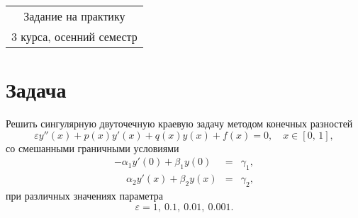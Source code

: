 \documentclass[a4paper,final,12pt]{article}
\begin{document}
\begin{center}
	\Large\bf\em 
	\begin{tabular}{c}
		Задание на практику \\
		3 курса, осенний семестр
	\end{tabular}
\end{center}

	
	
\section*{Задача}
Решить сингулярную двуточечную краевую задачу методом конечных разностей
$$
\varepsilon y''(x) + p(x)y'(x) + q(x)y(x) + f(x) = 0,\quad x\in[0,\,1],
$$
со смешанными граничными условиями
$$
\begin{array}{rcl}
-\alpha_1y'(0) + \beta_1y(0)			&=&	\gamma_1,\\[8pt]
\phantom{-}\alpha_2y'(x) + \beta_2y(x)	&=&	\gamma_2,
\end{array}
$$
при различных значениях параметра 
$$
\varepsilon=1,~0.1,~0.01,~0.001.
$$
\end{document}
